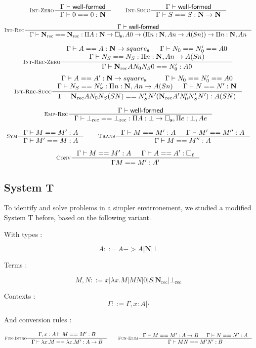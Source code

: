 \documentclass{article}
\DeclareMathOperator{\rec}{rec}
\newcommand{\0}{\mathbf{0}}
\newcommand{\1}{\mathbf{1}}
\newcommand{\nat}{\mathbf{N}}
\newcommand{\Wf}{\textsf{well-formed}}
\newcommand{\slvl}{\mathbf{s}}
\begin{document}
$$
    \inference[\textsc{Int-Zero}]{\Gamma |- \Wf}{\Gamma |- 0 == 0 : \nat} \qquad
    \inference[\textsc{Int-Succ}]{\Gamma |- \Wf}{\Gamma |- S == S : \nat -> \nat}
$$

$$
    \inference[\textsc{Int-Rec}]{\Gamma |- \Wf}{\Gamma |- \nat_{\rec} == \nat_{\rec} : \Pi A : \nat \to \square_\slvl, A 0 \to \left(\Pi n:\nat, A n \to A (S n)\right) \to \Pi n :\nat, A n}
$$


$$
    \inference[\textsc{Int-Rec-Zero}]{\Gamma |- A == A : \nat -> square_\slvl & \Gamma |- N_0 == N'_0 == A 0\\ \Gamma |- N_S == N_S : \Pi n:\nat, A n -> A(S n)}{\Gamma |- \nat_{\rec} A N_0N_S0 == N'_0 : A 0}
$$
$$
    \inference[\textsc{Int-Rec-Succ}]{\Gamma |- A == A' : \nat -> square_\slvl & \Gamma |- N_0 == N'_0 == A 0\\ \Gamma |- N_S == N'_S : \Pi n:\nat, A n -> A(S n) & \Gamma |- N == N' :\nat}{\Gamma |- \nat_{\rec} A N_0N_S (S N) == N'_S N' (\nat_{\rec}A' N'_0 N'_S N') : A (S N)}
$$


$$
    \inference[\textsc{Emp-Rec}]{\Gamma |- \Wf}{\Gamma |- \bot_{\rec} == \bot_{\rec} : \Pi A : \bot \to \square_\slvl,\Pi e :\bot, A e}
$$

$$
    \inference[\textsc{Sym}]{\Gamma |- M == M' : A}{\Gamma |- M' == M : A} \qquad
    \inference[\textsc{Trans}]
    {\Gamma |- M == M' :A & \Gamma |- M' == M'' : A}{\Gamma |- M == M'' : A}
$$

$$
    \inference[\textsc{Conv}]
    {\Gamma |- M == M' :A & \Gamma |- A == A' : \square_\ell}{\Gamma M ==M' : A'}
$$

\subsection{System T}

To identify and solve problems in a simpler envirronement, we studied a modified System T before, based on the following variant.

With types :

$$ A ::= A -> A | \nat | \bot $$

Terms :

$$ M,N ::= x | \lambda x. M | MN | 0 | S | \nat_{\rec} | \bot_{\rec} $$


Contexts :
$$ \Gamma ::= \Gamma, x : A | \cdot $$

And conversion rules :


$$
    \inference[\textsc{Fun-Intro}]{\Gamma, x : A |- M == M' : B }{\Gamma |- \lambda x. M == \lambda x. M' : A -> B} \qquad
    \inference[\textsc{Fun-Elim}]{\Gamma |- M == M' : A -> B& \Gamma |- N == N' : A}{\Gamma |- MN == M'N' : B}
$$
\end{document}
